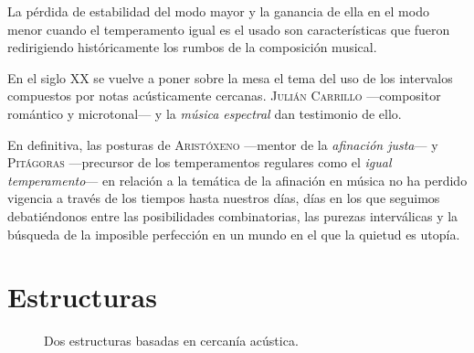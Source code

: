 \documentclass[a4paper,11pt]{article}
\begin{document}
\begin{multicols}{2}
  La pérdida de estabilidad del modo mayor y la ganancia de ella en el modo menor cuando el temperamento igual es el usado son características que fueron redirigiendo históricamente los rumbos de la composición musical.

  En el siglo XX se vuelve a poner sobre la mesa el tema del uso de los intervalos compuestos por notas acústicamente cercanas. \textsc{Julián Carrillo} ---compositor romántico y microtonal--- y la \emph{música espectral} dan testimonio de ello.

  En definitiva, las posturas de \textsc{Aristóxeno} ---mentor de la \emph{afinación justa}--- y \textsc{Pitágoras} ---precursor de los temperamentos regulares como el \emph{igual temperamento}--- en relación a la temática de la afinación en música no ha perdido vigencia a través de los tiempos hasta nuestros días, días en los que seguimos debatiéndonos entre las posibilidades combinatorias, las purezas interválicas y la búsqueda de la imposible perfección en un mundo en el que la quietud es utopía.
\end{multicols}

\newpage
\section{Estructuras}\label{sec:estructuras}
\begin{figure}[ht]
\centering
\caption{Dos estructuras basadas en cercanía acústica.}\label{fig:dos-estructuras}
\end{figure}
\end{document}

